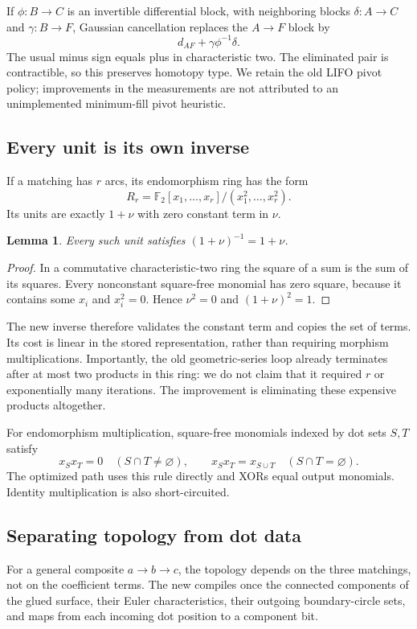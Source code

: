 \documentclass[11pt]{article}
\newtheorem{lemma}[theorem]{Lemma}
\theoremstyle{remark}\newtheorem{remark}[theorem]{Remark}
\newcommand{\F}{\mathbb F}
\newcommand{\code}[1]{\texttt{\detokenize{#1}}}
\begin{document}
If $\phi:B\to C$ is an invertible differential block, with neighboring blocks
$\delta:A\to C$ and $\gamma:B\to F$, Gaussian cancellation replaces the
$A\to F$ block by
\begin{equation}
 d_{AF}+\gamma\phi^{-1}\delta.
 \label{eq:cancel}
\end{equation}
The usual minus sign equals plus in characteristic two. The eliminated pair is
contractible, so this preserves homotopy type. We retain the old LIFO pivot
policy; improvements in the measurements are not attributed to an unimplemented
minimum-fill pivot heuristic.

\subsection{Every unit is its own inverse}
If a matching has $r$ arcs, its endomorphism ring has the form
\begin{equation}
 R_r=\F_2[x_1,\ldots,x_r]/(x_1^2,\ldots,x_r^2).
\end{equation}
Its units are exactly $1+\nu$ with zero constant term in $\nu$.
\begin{lemma}
Every such unit satisfies $(1+\nu)^{-1}=1+\nu$.
\end{lemma}
\begin{proof}
In a commutative characteristic-two ring the square of a sum is the sum of its
squares. Every nonconstant square-free monomial has zero square, because it
contains some $x_i$ and $x_i^2=0$. Hence $\nu^2=0$ and
$(1+\nu)^2=1$.
\end{proof}

The new inverse therefore validates the constant term and copies the set of
terms. Its cost is linear in the stored representation, rather than requiring
morphism multiplications. Importantly, the old geometric-series loop already
terminates after at most two products in this ring: we do not claim that it
required $r$ or exponentially many iterations. The improvement is eliminating
these expensive products altogether.

For endomorphism multiplication, square-free monomials indexed by dot sets
$S,T$ satisfy
\[
 x_Sx_T=0\quad(S\cap T\ne\varnothing),\qquad
 x_Sx_T=x_{S\cup T}\quad(S\cap T=\varnothing).
\]
The optimized path uses this rule directly and XORs equal output monomials.
Identity multiplication is also short-circuited.

\subsection{Separating topology from dot data}
For a general composite $a\to b\to c$, the topology depends on the three
matchings, not on the coefficient terms. The new \code{_composition_plan}
compiles once the connected components of the glued surface, their Euler
characteristics, their outgoing boundary-circle sets, and maps from each
incoming dot position to a component bit.
\end{document}
